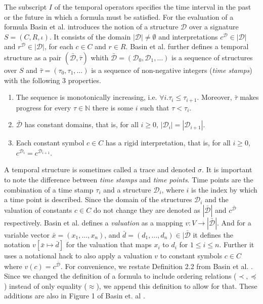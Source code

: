 The subscript $I$ of the temporal operators specifies the time interval in the past or the future in which a formula must be satisfied.
For the evaluation of a formula Basin et al. \cite{Basin2015} introduces the notion of a structure $\mathcal{D}$ over a signature $S=(C,R,\iota)$.
It consists of the domain $| \mathcal{D} | \neq \emptyset$ and interpretations $c^\mathcal{D} \in |\mathcal{D}|$ and $r^\mathcal{D} \in |\mathcal{D}|$, for each $c \in C$ and $r \in R$.
Basin et al. \cite{Basin2015} further defines a temporal structure as a pair $(\bar{\mathcal{D}}, \bar{\tau})$ whith $\bar{\mathcal{D}} = (\mathcal{D}_0, \mathcal{D}_1, \dots)$ is a sequence of structures over $S$ and $\bar{\tau} = (\tau_0, \tau_1, \dots)$ is a sequence of non-negative integers (\textit{time stamps}) with the following 3 properties.
\renewcommand{\labelenumi}{\arabic{enumi}.}
\begin{enumerate}
    \item The sequence is monotonically increasing, i.e. $\forall i . \tau_i \leq \tau_{i+1}$. Moreover, $\bar{\tau}$ makes progress for every $\tau \in \mathbb{N}$ there is some $i$ such that $\tau < \tau_i$. 
    \item $\bar{\mathcal{D}}$ has constant domains, that is, for all $i \geq 0$, $|\mathcal{D}_i| = |\mathcal{D}_{i+1}|$.
    \item Each constant symbol $c \in C$ has a rigid interpretation, that is, for all $i \geq 0$, $c^{\mathcal{D}_i} = c^{\mathcal{D}_{i+1}}$.
\end{enumerate}
A temporal structure is sometimes called a trace and denoted $\sigma$.
It is important to note the difference between \textit{time stamps} and \textit{time points}.
Time points are the combination of a time stamp $\tau_i$ and a structure $\mathcal{D}_i$, where $i$ is the index by which a time point is described.
Since the domain of the structures $\mathcal{D}_i$ and the valuation of constants $c \in C$ do not change they are denoted as $|\bar{\mathcal{D}}|$ and $c^{\bar{\mathcal{D}}}$ respectively.
Basin et al. defines a \textit{valuation} as a mapping $v : V \to |\bar{\mathcal{D}}|$.
And for a variable vector $\bar{x} = (x_1,\dots,x_n)$, and $\bar{d}=(d_1,\dots,d_n) \in |\bar{\mathcal{D}}$ it defines the notation $v[\bar{x} \mapsto \bar{d}]$ for the valuation that maps $x_i$ to $d_i$ for $1 \leq i \leq n$.
Further it uses a notational hack to also apply a valuation $v$ to constant symbols $c \in C$ where $v(c) = c^{\bar{\mathcal{D}}}$.
For convenience, we restate Definition 2.2 from Basin et al. \cite{Basin2015}.
Since we changed the definition of a formula to include ordering relations ($\prec, \preceq$) instead of only equality ($\approx$), we append this definition to allow for that.
These additions are also in Figure 1 of Basin et. al \cite{Basin2020}.

